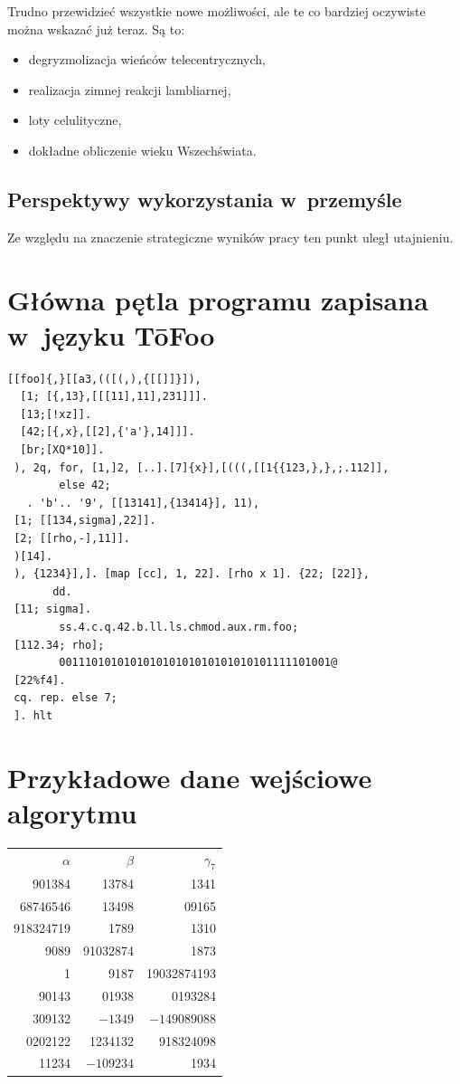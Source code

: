 \documentclass[licencjacka]{pracamgr}
\begin{document}
Trudno przewidzieć wszystkie nowe możliwości, ale te co bardziej
oczywiste można wskazać już teraz.  Są to:
\begin{itemize}
\item degryzmolizacja wieńców telecentrycznych,
\item realizacja zimnej reakcji lambliarnej,
\item loty celulityczne,
\item dokładne obliczenie wieku Wszechświata.
\end{itemize}

\section{Perspektywy wykorzystania w~przemyśle}

Ze względu na znaczenie strategiczne wyników pracy ten punkt uległ
utajnieniu.

\appendix

\chapter{Główna pętla programu zapisana w~języku T\=oFoo}

\begin{verbatim}
[[foo]{,}[[a3,(([(,),{[[]]}]),
  [1; [{,13},[[[11],11],231]]].
  [13;[!xz]].
  [42;[{,x},[[2],{'a'},14]]].
  [br;[XQ*10]].
 ), 2q, for, [1,]2, [..].[7]{x}],[(((,[[1{{123,},},;.112]],
        else 42;
   . 'b'.. '9', [[13141],{13414}], 11),
 [1; [[134,sigma],22]].
 [2; [[rho,-],11]].
 )[14].
 ), {1234}],]. [map [cc], 1, 22]. [rho x 1]. {22; [22]},
       dd.
 [11; sigma].
        ss.4.c.q.42.b.ll.ls.chmod.aux.rm.foo;
 [112.34; rho];
        001110101010101010101010101010101111101001@
 [22%f4].
 cq. rep. else 7;
 ]. hlt
\end{verbatim}

\chapter{Przykładowe dane wejściowe algorytmu}

\begin{center}
  \begin{tabular}{rrr}
    $\alpha$ & $\beta$ & $\gamma_7$ \\
    901384 & 13784 & 1341\\
    68746546 & 13498& 09165\\
    918324719& 1789 & 1310 \\
    9089 & 91032874& 1873 \\
    1 & 9187 & 19032874193 \\
    90143 & 01938 & 0193284 \\
    309132 & $-1349$ & $-149089088$ \\
    0202122 & 1234132 & 918324098 \\
    11234 & $-109234$ & 1934 \\
  \end{tabular}
\end{center}
\end{document}
